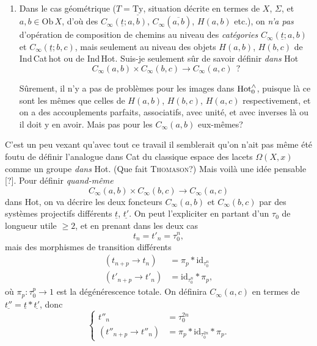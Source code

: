 \begin{enumerate}
\item[f)] Dans le cas géométrique ($T = \underline{\mathrm{Ty}}$, situation décrite en termes de $X$, $\Sigma$, et $a, b \in \mathrm{Ob}\,X$, d'où des $C_\infty(\underline{t}; a, b)$, $C_\infty(\overline{a, b})$, $H(a,b)$ etc.), on \textit{n'a pas} d'opération de composition de chemins au niveau des \textit{catégories} $C_\infty(\underline{t}; a, b)$ et $C_\infty(\underline{t}; b, c)$, mais seulement au niveau des objets $H(a,b)$, $H(b,c)$ de Ind\,Cat\,hot ou de Ind\,Hot. Suis-je seulement sûr de savoir définir \textit{dans} Hot
\[
C_\infty(a,b) \times C_\infty(b,c) \longrightarrow C_\infty(a,c) \ \ ?
\]

Sûrement, il n'y a pas de problèmes pour les images dans $\mathrm{Hot}^{\wedge}_{0}$, puisque là ce sont les mêmes que celles de $H(a,b)$, $H(b,c)$, $H(a,c)$ respectivement, et on a des accouplements parfaits, associatifs, avec unité, et avec inverses là ou il doit y %
en avoir. Mais pas pour les $C_\infty(a,b)$ eux-mêmes?
\end{enumerate}

C'est un peu vexant qu'avec tout ce travail il semblerait qu'on n'ait pas même été foutu de définir l'analogue dans Cat du classique espace des lacets $\Omega(X, x)$ comme un groupe \textit{dans} Hot. (Que fait \textsc{Thomason}?) Mais voilà une idée pensable [?]. Pour définir \textit{quand-même}
\[
C_\infty(a,b) \times C_\infty(b,c) \longrightarrow C_\infty(a,c)
\]
dans Hot, on va décrire les deux foncteurs $C_\infty(a,b)$ et $C_\infty(b,c)$ par des systèmes projectifs différents $\underline{t}$, $\underline{t'}$. On peut l'expliciter en partant d'un $\tau_0$ de longueur utile $\geq 2$, et en prenant dans les deux cas
\[
t_n = t'_n = \tau_0^n,
\]
mais des morphismes de transition différents
\[
\begin{aligned}
(t_{n+p} \longrightarrow t_n) &= \pi_p * \mathrm{id}_{\tau_0^n} \\
(t'_{n+p} \longrightarrow t'_n) &= \mathrm{id}_{\tau_0^n} * \pi_p,
\end{aligned}
\]
où $\pi_p : \tau_0^p \longrightarrow 1$ est la dégénérescence totale. On définira $C_\infty(a,c)$ en termes de $\underline{t''} = \underline{t} * \underline{t'}$, donc
\[
\left\{
\begin{aligned}
t''_n &= \tau_0^{2n} \\
(t''_{n+p} \longrightarrow t''_n) &= \pi_p * \mathrm{id}_{\tau_0^{2n}} * \pi_p.
\end{aligned}
\right.
\]

